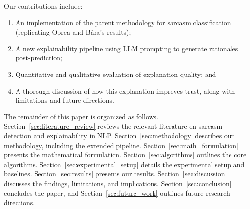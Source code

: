 Our contributions include:
\begin{enumerate}[label=(\arabic*)]
    \item An implementation of the parent methodology for sarcasm classification (replicating Oprea and B\^{a}ra's results);
    \item A new explainability pipeline using LLM prompting to generate rationales post-prediction;
    \item Quantitative and qualitative evaluation of explanation quality; and
    \item A thorough discussion of how this explanation improves trust, along with limitations and future directions.
\end{enumerate}

The remainder of this paper is organized as follows. Section~\ref{sec:literature_review} reviews the relevant literature on sarcasm detection and explainability in NLP\@. Section~\ref{sec:methodology} describes our methodology, including the extended pipeline. Section~\ref{sec:math_formulation} presents the mathematical formulation. Section~\ref{sec:algorithms} outlines the core algorithms. Section~\ref{sec:experimental_setup} details the experimental setup and baselines. Section~\ref{sec:results} presents our results. Section~\ref{sec:discussion} discusses the findings, limitations, and implications. Section~\ref{sec:conclusion} concludes the paper, and Section~\ref{sec:future_work} outlines future research directions.

